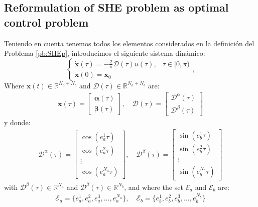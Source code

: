 \subsection{Reformulation of SHE problem as optimal control problem}
Teniendo en cuenta tenemos todos los elementos considerados en la definición del Problema \ref{pb:SHEp}, introducimos el siguiente sistema dinámico:
\begin{equation}\label{eq:CauchyReversed}
    \begin{cases}
        \displaystyle\dot{\bm{x}}(\tau) = -\frac 2\pi\bm{\mathcal{D}}(\tau)u(\tau),  & \tau \in [0,\pi)
        \\[6pt]
        \bm{x}(0) = \bm{x}_0
    \end{cases},
\end{equation}
Where $\bm{x}(t) \in \mathbb{R}^{N_a + N_b}$ and $\bm{\mathcal{D}}(\tau) \in  \mathbb{R}^{N_a + N_b}$ are:
\begin{align*}
	\bm{x}(\tau) = \begin{bmatrix} \bm{\alpha}(\tau) \\ \bm{\beta}(\tau) \end{bmatrix}, \quad
	\bm{\mathcal{D}}(\tau) = \begin{bmatrix} \bm{\mathcal{D}}^\alpha(\tau) \\ \bm{\mathcal{D}}^\beta(\tau) \end{bmatrix}     
\end{align*}
y donde:
\begin{align*}
	\bm{\mathcal{D}}^\alpha(\tau) = 
	\begin{bmatrix} 
		\cos(e_a^1\tau) \\ \cos(e_a^2\tau) \\ \vdots \\ \cos(e_a^{N_a}\tau) 
	\end{bmatrix},
	\quad \bm{\mathcal{D}}^\beta(\tau) = 
	\begin{bmatrix} 
		\sin(e_b^1\tau) \\ \sin(e_b^2\tau) \\ \vdots \\ \sin(e_b^{N_b}\tau) 
	\end{bmatrix} 
\end{align*}
with $\bm{\mathcal{D}}^\beta(\tau) \in \mathbb{R}^{N_a} $ and $ \bm{\mathcal{D}}^\beta(\tau) \in \mathbb{R}^{N_b}$, and where the set $\mathcal{E}_a$ and $\mathcal{E}_b$ are:
\begin{align*}
	\mathcal{E}_a = \{e_a^1,e_a^2,e_a^3,\dots,e_a^{N_a}\}, \quad \mathcal{E}_b = \{e_b^1,e_b^2,e_b^3,\dots,e_b^{N_b}\}    
\end{align*}
